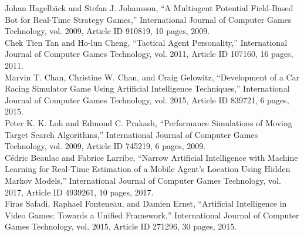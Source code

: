 \begin{thebibliography}{1}
 Johan Hagelbäck and Stefan J. Johansson, “A Multiagent Potential Field-Based Bot for Real-Time Strategy Games,” International Journal of Computer Games Technology, vol. 2009, Article ID 910819, 10 pages, 2009. 
\\

Chek Tien Tan and Ho-lun Cheng, “Tactical Agent Personality,” International Journal of Computer Games Technology, vol. 2011, Article ID 107160, 16 pages, 2011.
\\

Marvin T. Chan, Christine W. Chan, and Craig Gelowitz, “Development of a Car Racing Simulator Game Using Artificial Intelligence Techniques,” International Journal of Computer Games Technology, vol. 2015, Article ID 839721, 6 pages, 2015.
\\

Peter K. K. Loh and Edmond C. Prakash, “Performance Simulations of Moving Target Search Algorithms,” International Journal of Computer Games Technology, vol. 2009, Article ID 745219, 6 pages, 2009. 
\\

Cédric Beaulac and Fabrice Larribe, “Narrow Artificial Intelligence with Machine Learning for Real-Time Estimation of a Mobile Agent’s Location Using Hidden Markov Models,” International Journal of Computer Games Technology, vol. 2017, Article ID 4939261, 10 pages, 2017. 
\\

Firas Safadi, Raphael Fonteneau, and Damien Ernst, “Artificial Intelligence in Video Games: Towards a Unified Framework,” International Journal of Computer Games Technology, vol. 2015, Article ID 271296, 30 pages, 2015. 

\end{thebibliography}